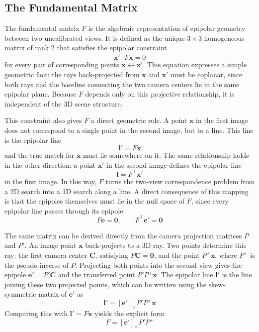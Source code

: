 \subsection{The Fundamental Matrix}

The fundamental matrix $F$ is the algebraic representation of epipolar geometry between two uncalibrated views. It is defined as the unique $3 \times 3$ homogeneous matrix of rank 2 that satisfies the epipolar constraint
\begin{equation}
    \mathbf{x}'^\top F \mathbf{x} = 0
\end{equation}
for every pair of corresponding points $\mathbf{x} \leftrightarrow \mathbf{x}'$. This equation expresses a simple geometric fact: the rays back-projected from $\mathbf{x}$ and $\mathbf{x}'$ must be coplanar, since both rays and the baseline connecting the two camera centers lie in the same epipolar plane. Because $F$ depends only on this projective relationship, it is independent of the 3D scene structure.

This constraint also gives $F$ a direct geometric role. A point $\mathbf{x}$ in the first image does not correspond to a single point in the second image, but to a line. This line is the epipolar line
\begin{equation}
    \mathbf{l}' = F \mathbf{x}
\end{equation}
and the true match for $\mathbf{x}$ must lie somewhere on it. The same relationship holds in the other direction: a point $\mathbf{x}'$ in the second image defines the epipolar line
\begin{equation}
    \mathbf{l} = F^\top \mathbf{x}'
\end{equation}
in the first image. In this way, $F$ turns the two-view correspondence problem from a 2D search into a 1D search along a line. A direct consequence of this mapping is that the epipoles themselves must lie in the null space of $F$, since every epipolar line passes through its epipole:
\begin{equation}
    F\mathbf{e} = \mathbf{0}, \qquad F^\top \mathbf{e}' = \mathbf{0}
\end{equation}

The same matrix can be derived directly from the camera projection matrices $P$ and $P'$. An image point $\mathbf{x}$ back-projects to a 3D ray. Two points determine this ray: the first camera center $\mathbf{C}$, satisfying $P\mathbf{C} = \mathbf{0}$, and the point $P^{+}\mathbf{x}$, where $P^{+}$ is the pseudo-inverse of $P$. Projecting both points into the second view gives the epipole $\mathbf{e}' = P'\mathbf{C}$ and the transferred point $P'P^{+}\mathbf{x}$. The epipolar line $\mathbf{l}'$ is the line joining these two projected points, which can be written using the skew-symmetric matrix of $\mathbf{e}'$ as
\begin{equation}
    \mathbf{l}' = [\mathbf{e}']_\times P' P^{+} \mathbf{x}
\end{equation}
Comparing this with $\mathbf{l}' = F\mathbf{x}$ yields the explicit form
\begin{equation}
    F = [\mathbf{e}']_\times P' P^{+}
\end{equation}

